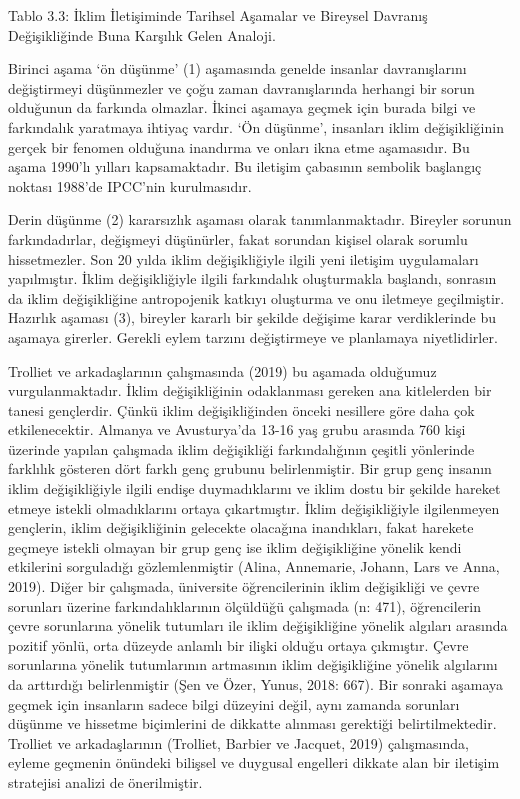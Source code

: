 \documentclass[
]{book}
\begin{document}
Tablo 3.3: İklim İletişiminde Tarihsel Aşamalar ve Bireysel Davranış Değişikliğinde Buna Karşılık Gelen Analoji.

Birinci aşama `ön düşünme' (1) aşamasında genelde insanlar davranışlarını değiştirmeyi düşünmezler ve çoğu zaman davranışlarında herhangi bir sorun olduğunun da farkında olmazlar. İkinci aşamaya geçmek için burada bilgi ve farkındalık yaratmaya ihtiyaç vardır. `Ön düşünme', insanları iklim değişikliğinin gerçek bir fenomen olduğuna inandırma ve onları ikna etme aşamasıdır. Bu aşama 1990'lı yılları kapsamaktadır. Bu iletişim çabasının sembolik başlangıç noktası 1988'de IPCC'nin kurulmasıdır.

Derin düşünme (2) kararsızlık aşaması olarak tanımlanmaktadır. Bireyler sorunun farkındadırlar, değişmeyi düşünürler, fakat sorundan kişisel olarak sorumlu hissetmezler. Son 20 yılda iklim değişikliğiyle ilgili yeni iletişim uygulamaları yapılmıştır. İklim değişikliğiyle ilgili farkındalık oluşturmakla başlandı, sonrasın da iklim değişikliğine antropojenik katkıyı oluşturma ve onu iletmeye geçilmiştir.
Hazırlık aşaması (3), bireyler kararlı bir şekilde değişime karar verdiklerinde bu aşamaya girerler. Gerekli eylem tarzını değiştirmeye ve planlamaya niyetlidirler.

Trolliet ve arkadaşlarının çalışmasında (2019) bu aşamada olduğumuz vurgulanmaktadır.
İklim değişikliğinin odaklanması gereken ana kitlelerden bir tanesi gençlerdir. Çünkü iklim değişikliğinden önceki nesillere göre daha çok etkilenecektir. Almanya ve Avusturya'da 13-16 yaş grubu arasında 760 kişi üzerinde yapılan çalışmada iklim değişikliği farkındalığının çeşitli yönlerinde farklılık gösteren dört farklı genç grubunu belirlenmiştir. Bir grup genç insanın iklim değişikliğiyle ilgili endişe duymadıklarını ve iklim dostu bir şekilde hareket etmeye istekli olmadıklarını ortaya çıkartmıştır. İklim değişikliğiyle ilgilenmeyen gençlerin, iklim değişikliğinin gelecekte olacağına inandıkları, fakat harekete geçmeye istekli olmayan bir grup genç ise iklim değişikliğine yönelik kendi etkilerini sorguladığı gözlemlenmiştir (Alina, Annemarie, Johann, Lars ve Anna, 2019). Diğer bir çalışmada, üniversite öğrencilerinin iklim değişikliği ve çevre sorunları üzerine farkındalıklarının ölçüldüğü çalışmada (n: 471), öğrencilerin çevre sorunlarına yönelik tutumları ile iklim değişikliğine yönelik algıları arasında pozitif yönlü, orta düzeyde anlamlı bir ilişki olduğu ortaya çıkmıştır. Çevre sorunlarına yönelik tutumlarının artmasının iklim değişikliğine yönelik algılarını da arttırdığı belirlenmiştir (Şen ve Özer, Yunus, 2018: 667). Bir sonraki aşamaya geçmek için insanların sadece bilgi düzeyini değil, aynı zamanda sorunları düşünme ve hissetme biçimlerini de dikkatte alınması gerektiği belirtilmektedir. Trolliet ve arkadaşlarının (Trolliet, Barbier ve Jacquet, 2019) çalışmasında, eyleme geçmenin önündeki bilişsel ve duygusal engelleri dikkate alan bir iletişim stratejisi analizi de önerilmiştir.
\end{document}
